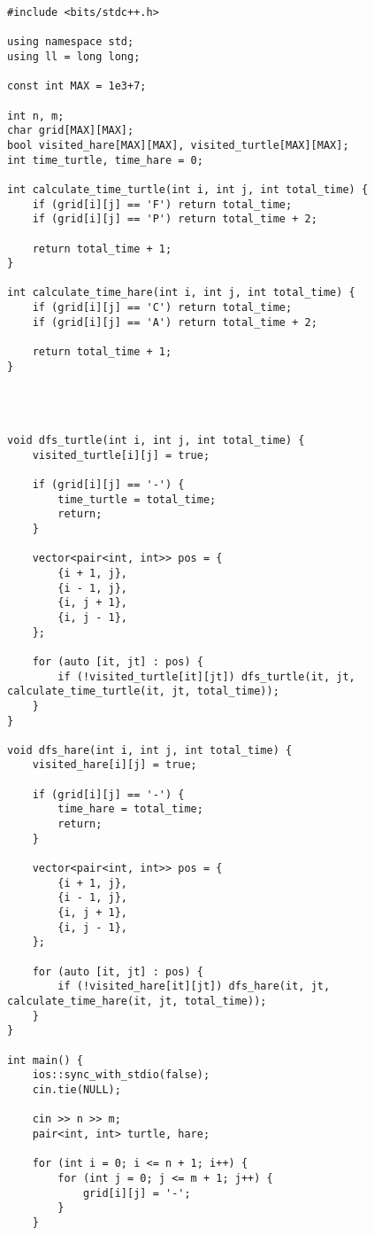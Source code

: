 \documentclass[11pt,fancychapters]{article}
\begin{document}
\begin{lstlisting}[style=c++]
#include <bits/stdc++.h>
 
using namespace std;
using ll = long long;
 
const int MAX = 1e3+7;
 
int n, m;
char grid[MAX][MAX];
bool visited_hare[MAX][MAX], visited_turtle[MAX][MAX];
int time_turtle, time_hare = 0;
 
int calculate_time_turtle(int i, int j, int total_time) {
    if (grid[i][j] == 'F') return total_time;
    if (grid[i][j] == 'P') return total_time + 2;
    
    return total_time + 1;
}
 
int calculate_time_hare(int i, int j, int total_time) {
    if (grid[i][j] == 'C') return total_time;
    if (grid[i][j] == 'A') return total_time + 2;
    
    return total_time + 1;
}



 
void dfs_turtle(int i, int j, int total_time) {
    visited_turtle[i][j] = true;
    
    if (grid[i][j] == '-') {
        time_turtle = total_time;
        return;
    }
    
    vector<pair<int, int>> pos = {
        {i + 1, j},
        {i - 1, j},
        {i, j + 1},
        {i, j - 1},
    };
    
    for (auto [it, jt] : pos) {
        if (!visited_turtle[it][jt]) dfs_turtle(it, jt, calculate_time_turtle(it, jt, total_time));
    }
}
 
void dfs_hare(int i, int j, int total_time) {
    visited_hare[i][j] = true;
    
    if (grid[i][j] == '-') {
        time_hare = total_time;
        return;
    }
    
    vector<pair<int, int>> pos = {
        {i + 1, j},
        {i - 1, j},
        {i, j + 1},
        {i, j - 1},
    };
    
    for (auto [it, jt] : pos) {
        if (!visited_hare[it][jt]) dfs_hare(it, jt, calculate_time_hare(it, jt, total_time));
    }
}
 
int main() {
    ios::sync_with_stdio(false);
    cin.tie(NULL);
    
    cin >> n >> m;
    pair<int, int> turtle, hare;
    
    for (int i = 0; i <= n + 1; i++) {
        for (int j = 0; j <= m + 1; j++) {
            grid[i][j] = '-';
        }
    }





\end{lstlisting}
\end{document}
